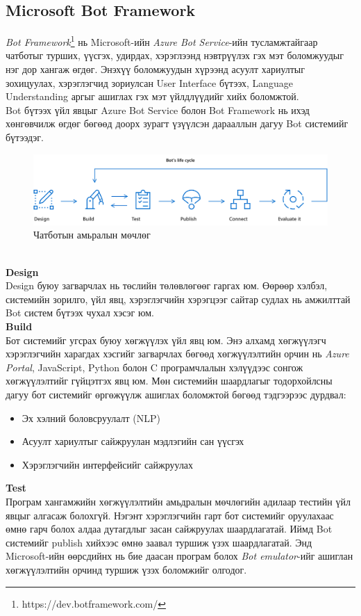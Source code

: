 \subsection{Microsoft Bot Framework}
\textit{Bot Framework}\footnote{https://dev.botframework.com/} нь Microsoft-ийн \textit{Azure Bot Service}-ийн тусламжтайгаар чатботыг турших, үүсгэх, удирдах, хэрэглээнд нэвтрүүлэх гэх мэт боломжуудыг нэг дор хангаж өгдөг. Энэхүү боломжуудын хүрээнд асуулт хариултыг зохицуулах, хэрэглэгчид зориулсан User Interface бүтээх, Language Understanding аргыг ашиглах гэх мэт үйлдлүүдийг хийх боломжтой.
\\Bot бүтээх үйл явцыг Azure Bot Service болон Bot Framework нь ихэд хөнгөвчилж өгдөг бөгөөд доорх зурагт үзүүлсэн дарааллын дагуу Bot системийг бүтээдэг.
\begin{figure}[ht]
  \includegraphics[width=\textwidth]{images/azureSteps.png}
  \caption{Чатботын амьралын мөчлөг}
\end{figure}
\\\textbf{Design}
\\Design буюу загварчлах нь төслийн төлөвлөгөөг гаргах юм. Өөрөөр хэлбэл, системийн зорилго, үйл явц, хэрэглэгчийн хэрэгцээг сайтар судлах нь амжилттай Bot систем бүтээх чухал хэсэг юм.
\\\textbf{Build}
\\Бот системийг угсрах буюу хөгжүүлэх үйл явц юм. Энэ алхамд хөгжүүлэгч хэрэглэгчийн харагдах хэсгийг загварчлах бөгөөд хөгжүүлэлтийн орчин нь \textit{Azure Portal}, JavaScript, Python болон C програмчлалын хэлүүдээс сонгож хөгжүүлэлтийг гүйцэтгэх явц юм. Мөн системийн шаардлагыг тодорхойлсны дагуу бот системийг өргөжүүлж ашиглах боломжтой бөгөөд тэдгээрээс дурдвал:
\begin{itemize}
  \item Эх хэлний боловсруулалт (NLP)
  \item Асуулт хариултыг сайжруулан мэдлэгийн сан үүсгэх
  \item Хэрэглэгчийн интерфейсийг сайжруулах
\end{itemize}
\textbf{Test}
\\Програм хангамжийн хөгжүүлэлтийн амьдралын мөчлөгийн адилаар тестийн үйл явцыг алгасаж болохгүй. Нэгэнт хэрэглэгчийн гарт бот системийг оруулахаас өмнө гарч болох алдаа дутагдлыг засан сайжруулах шаардлагатай.  Иймд Bot системийг publish хийхээс өмнө заавал туршиж үзэх шаардлагатай. Энд Microsoft-ийн өөрсдийнх нь бие даасан програм болох \textit{Bot emulator}-ийг ашиглан хөгжүүлэлтийн орчинд туршиж үзэх боломжийг олгодог. 
